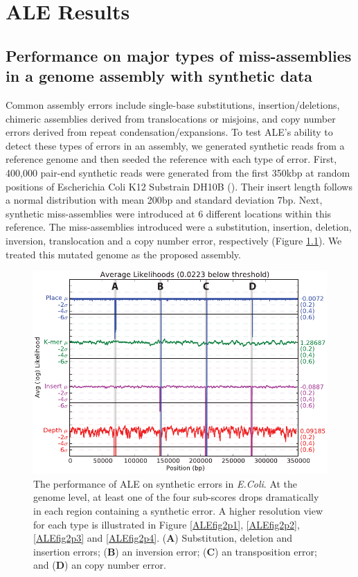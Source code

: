 \documentclass[phd,tocprelim]{cornell}
\begin{document}

\chapter{ALE Results} %
\label{cha:ALE Results}

\section{Performance on major types of miss-assemblies in a genome assembly with synthetic data}
Common assembly errors include single-base substitutions, insertion/deletions, chimeric assemblies derived from translocations or misjoins, and copy number errors derived from repeat condensation/expansions. To test ALE's ability to detect these types of errors in an assembly, we generated synthetic reads from a reference genome and then seeded the reference with each type of error. First, 400,000 pair-end synthetic reads were generated from the first 350kbp at random positions of Escherichia Coli K12 Substrain DH10B (\cite{Durfee2008}). Their insert length follows a normal distribution with mean 200bp and standard deviation 7bp. Next, synthetic miss-assemblies were introduced at 6 different locations within this reference.  The miss-assemblies introduced were a substitution, insertion, deletion, inversion, translocation and a copy number error, respectively (Figure \ref{ALEfig2}). We treated this mutated genome as the proposed assembly.

\begin{figure}[!htpb]%
    \centerline{\includegraphics[width=\textwidth]{figures/ALE/fig_2_top.pdf}}
    \caption[ALE performance on with synthetic reads]{The performance of ALE on synthetic errors in {\it E.Coli}. At the genome level, at least one of the four sub-scores drops dramatically in each region containing a synthetic error. A higher resolution view for each type is illustrated in Figure \ref{ALEfig2p1}, \ref{ALEfig2p2}, \ref{ALEfig2p3} and \ref{ALEfig2p4}. ({\bf A}) Substitution, deletion and insertion errors; ({\bf B}) an inversion error; ({\bf C}) an transposition error; and ({\bf D}) an copy number error.}\label{ALEfig2}
\end{figure}
\end{document}
